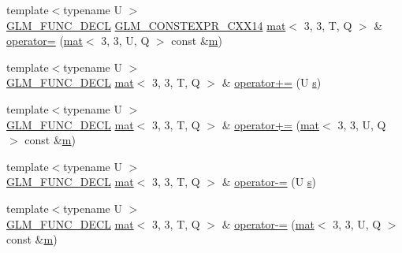 \begin{DoxyCompactItemize}
\item 
{\footnotesize template$<$typename U $>$ }\\\mbox{\hyperlink{setup_8hpp_ab2d052de21a70539923e9bcbf6e83a51}{G\+L\+M\+\_\+\+F\+U\+N\+C\+\_\+\+D\+E\+CL}} \mbox{\hyperlink{setup_8hpp_a4dd12abf5e1164bc57f3a34671d03844}{G\+L\+M\+\_\+\+C\+O\+N\+S\+T\+E\+X\+P\+R\+\_\+\+C\+X\+X14}} \mbox{\hyperlink{structglm_1_1mat}{mat}}$<$ 3, 3, T, Q $>$ \& \mbox{\hyperlink{structglm_1_1mat_3_013_00_013_00_01_t_00_01_q_01_4_a53aae107d0de9b06cf3def3d0645883f}{operator=}} (\mbox{\hyperlink{structglm_1_1mat}{mat}}$<$ 3, 3, U, Q $>$ const \&\mbox{\hyperlink{_s_d_l__opengl__glext_8h_af593500c283bf1a787a6f947f503a5c2}{m}})
\item 
{\footnotesize template$<$typename U $>$ }\\\mbox{\hyperlink{setup_8hpp_ab2d052de21a70539923e9bcbf6e83a51}{G\+L\+M\+\_\+\+F\+U\+N\+C\+\_\+\+D\+E\+CL}} \mbox{\hyperlink{structglm_1_1mat}{mat}}$<$ 3, 3, T, Q $>$ \& \mbox{\hyperlink{structglm_1_1mat_3_013_00_013_00_01_t_00_01_q_01_4_abf9da018243788a6fe452e4bdf18526d}{operator+=}} (U \mbox{\hyperlink{_s_d_l__opengl_8h_a4af680a6c683f88ed67b76f207f2e6e4}{s}})
\item 
{\footnotesize template$<$typename U $>$ }\\\mbox{\hyperlink{setup_8hpp_ab2d052de21a70539923e9bcbf6e83a51}{G\+L\+M\+\_\+\+F\+U\+N\+C\+\_\+\+D\+E\+CL}} \mbox{\hyperlink{structglm_1_1mat}{mat}}$<$ 3, 3, T, Q $>$ \& \mbox{\hyperlink{structglm_1_1mat_3_013_00_013_00_01_t_00_01_q_01_4_a52cc749283b195a2ad28964519032bd4}{operator+=}} (\mbox{\hyperlink{structglm_1_1mat}{mat}}$<$ 3, 3, U, Q $>$ const \&\mbox{\hyperlink{_s_d_l__opengl__glext_8h_af593500c283bf1a787a6f947f503a5c2}{m}})
\item 
{\footnotesize template$<$typename U $>$ }\\\mbox{\hyperlink{setup_8hpp_ab2d052de21a70539923e9bcbf6e83a51}{G\+L\+M\+\_\+\+F\+U\+N\+C\+\_\+\+D\+E\+CL}} \mbox{\hyperlink{structglm_1_1mat}{mat}}$<$ 3, 3, T, Q $>$ \& \mbox{\hyperlink{structglm_1_1mat_3_013_00_013_00_01_t_00_01_q_01_4_aed487ca4202482113e6399e7c63e2707}{operator-\/=}} (U \mbox{\hyperlink{_s_d_l__opengl_8h_a4af680a6c683f88ed67b76f207f2e6e4}{s}})
\item 
{\footnotesize template$<$typename U $>$ }\\\mbox{\hyperlink{setup_8hpp_ab2d052de21a70539923e9bcbf6e83a51}{G\+L\+M\+\_\+\+F\+U\+N\+C\+\_\+\+D\+E\+CL}} \mbox{\hyperlink{structglm_1_1mat}{mat}}$<$ 3, 3, T, Q $>$ \& \mbox{\hyperlink{structglm_1_1mat_3_013_00_013_00_01_t_00_01_q_01_4_a9774d11e0033307ef6b4161b7cad2984}{operator-\/=}} (\mbox{\hyperlink{structglm_1_1mat}{mat}}$<$ 3, 3, U, Q $>$ const \&\mbox{\hyperlink{_s_d_l__opengl__glext_8h_af593500c283bf1a787a6f947f503a5c2}{m}})

\end{DoxyCompactItemize}
